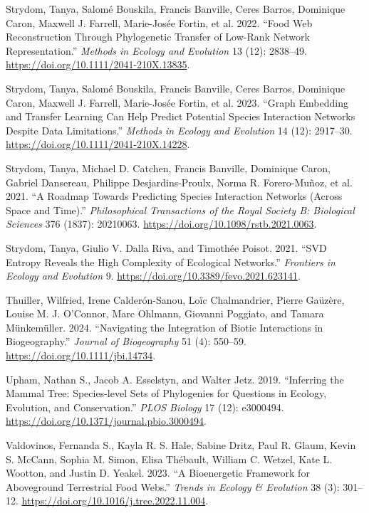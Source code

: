 \documentclass[
  letterpaper,
  DIV=11,
  numbers=noendperiod]{scrartcl}
\newlength{\cslhangindent}
\newenvironment{CSLReferences}[2] %
 {\begin{list}{}{%
  \setlength{\itemindent}{0pt}
  \setlength{\leftmargin}{0pt}
  \setlength{\parsep}{0pt}
  \ifodd #1
   \setlength{\leftmargin}{\cslhangindent}
   \setlength{\itemindent}{-1\cslhangindent}
  \fi
  \setlength{\itemsep}{#2\baselineskip}}}
 {\end{list}}
\begin{document}
\begin{CSLReferences}{1}{0}
Strydom, Tanya, Salomé Bouskila, Francis Banville, Ceres Barros,
Dominique Caron, Maxwell J. Farrell, Marie-Josée Fortin, et al. 2022.
{``Food Web Reconstruction Through Phylogenetic Transfer of Low-Rank
Network Representation.''} \emph{Methods in Ecology and Evolution} 13
(12): 2838--49. \url{https://doi.org/10.1111/2041-210X.13835}.

Strydom, Tanya, Salomé Bouskila, Francis Banville, Ceres Barros,
Dominique Caron, Maxwell J. Farrell, Marie-Josée Fortin, et al. 2023.
{``Graph Embedding and Transfer Learning Can Help Predict Potential
Species Interaction Networks Despite Data Limitations.''} \emph{Methods
in Ecology and Evolution} 14 (12): 2917--30.
\url{https://doi.org/10.1111/2041-210X.14228}.

Strydom, Tanya, Michael D. Catchen, Francis Banville, Dominique Caron,
Gabriel Dansereau, Philippe Desjardins-Proulx, Norma R. Forero-Muñoz, et
al. 2021. {``A Roadmap Towards Predicting Species Interaction Networks
(Across Space and Time).''} \emph{Philosophical Transactions of the
Royal Society B: Biological Sciences} 376 (1837): 20210063.
\url{https://doi.org/10.1098/rstb.2021.0063}.

Strydom, Tanya, Giulio V. Dalla Riva, and Timothée Poisot. 2021. {``{SVD
Entropy Reveals} the {High Complexity} of {Ecological Networks}.''}
\emph{Frontiers in Ecology and Evolution} 9.
\url{https://doi.org/10.3389/fevo.2021.623141}.

Thuiller, Wilfried, Irene Calderón-Sanou, Loïc Chalmandrier, Pierre
Gaüzère, Louise M. J. O'Connor, Marc Ohlmann, Giovanni Poggiato, and
Tamara Münkemüller. 2024. {``Navigating the Integration of Biotic
Interactions in Biogeography.''} \emph{Journal of Biogeography} 51 (4):
550--59. \url{https://doi.org/10.1111/jbi.14734}.

Upham, Nathan S., Jacob A. Esselstyn, and Walter Jetz. 2019.
{``Inferring the Mammal Tree: {Species-level} Sets of Phylogenies for
Questions in Ecology, Evolution, and Conservation.''} \emph{PLOS
Biology} 17 (12): e3000494.
\url{https://doi.org/10.1371/journal.pbio.3000494}.

Valdovinos, Fernanda S., Kayla R. S. Hale, Sabine Dritz, Paul R. Glaum,
Kevin S. McCann, Sophia M. Simon, Elisa Thébault, William C. Wetzel,
Kate L. Wootton, and Justin D. Yeakel. 2023. {``A Bioenergetic Framework
for Aboveground Terrestrial Food Webs.''} \emph{Trends in Ecology \&
Evolution} 38 (3): 301--12.
\url{https://doi.org/10.1016/j.tree.2022.11.004}.


\end{CSLReferences}
\end{document}
